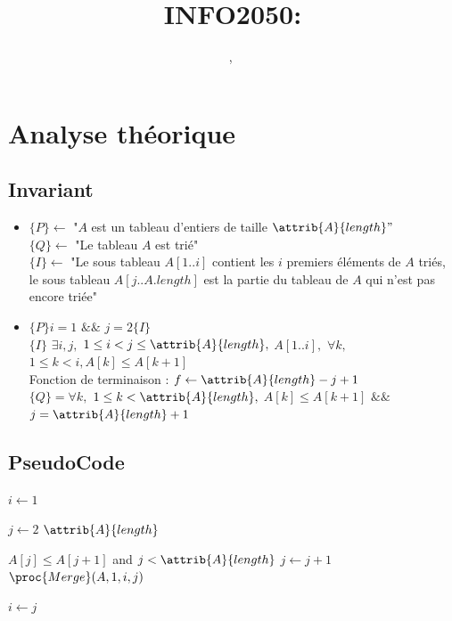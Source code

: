 \documentclass[a4paper, 11pt, oneside]{article}
\title{INFO2050: \intitule}
\author{\PrenomUN~\textsc{\NomUN}, \PrenomDEUX~\textsc{\NomDEUX}}
\date{}
\begin{document}
\maketitle
\newpage


	\section{Analyse théorique}
	\subsection{Invariant}
	\begin{itemize}[label=$\square$]

\item

	\noindent $\{P\} \gets$ "$A$ est un tableau d'entiers de taille $\attrib{A}{length}"$\\
	  $\{Q\} \gets$ "Le tableau $A$ est trié"\\ 
	$\{I\} \gets$ "Le sous tableau 
$A[1..i]$ contient les $i$ premiers éléments de $A$ triés, le sous tableau \indent \indent $A[j..A.length]$ est la partie du tableau de $A$ qui n'est pas encore triée"

\item $\{P\} i = 1$ $\&\&$ $j = 2 \{I\}$
\\ $\{I\}$  $\exists i,j,$ $1 \leq i < j \leq \attrib{A}{length},$  $A[1..i],$ $\forall k,$ $1 \leq k < i, A[k] \leq A[k+1]$ \\
\indent Fonction de terminaison : $f \gets \attrib{A}{length}-j +1$
\\ $\{Q\} = \forall k,$ $1 \leq k < \attrib{A}{length},$ $A[k] \leq A[k+1]$ $\&\&$ $j=\attrib{A}{length}+1$

\end{itemize}

	\subsection{PseudoCode}
	\label{PseudoCode}
	
	\begin{codebox}
\li $i \gets 1$

\li \For $j \gets 2$ \To $\attrib{A}{length}$
\Do

\li \While $A[j] \leq A[j+1]$ and $j < \attrib{A}{length}$
\li \Do
$j \gets j + 1$
\End
\li $\proc{Merge}(A, 1, i, j)$

\li $i \gets j$
\End
\end{codebox}
\end{document}
